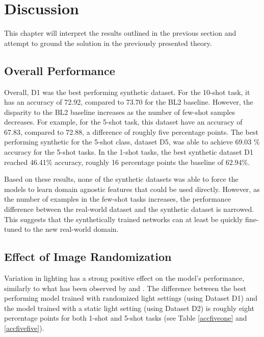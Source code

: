 \chapter{Discussion} %
This chapter will interpret the results outlined in the previous section and attempt to ground the solution in the previously presented theory.

\section{Overall Performance}
Overall, D1 was the best performing synthetic dataset. For the 10-shot task, it has an accuracy of 72.92, compared to 73.70 for the BL2 baseline. However, the disparity to the BL2 baseline increases as the number of few-shot samples decreases. For example, for the 5-shot task, this dataset have an accuracy of 67.83, compared to 72.88, a difference of roughly five percentage points. The best performing synthetic for the 5-shot class, dataset D5, was able to achieve 69.03 \% accuracy for the 5-shot tasks. In the 1-shot tasks, the best synthetic dataset D1 reached 46.41\% accuracy, roughly 16 percentage points the baseline of 62.94\%.


Based on these results, none of the synthetic datasets was able to force the models to learn domain agnostic features that could be used directly. However, as the number of examples in the few-shot tasks increases, the performance difference between the real-world dataset and the synthetic dataset is narrowed. This suggests that the synthetically trained networks can at least be quickly fine-tuned to the new real-world domain.

\section{Effect of Image Randomization}
Variation in lighting has a strong positive effect on the model's performance, similarly to what has been observed by \textcite{domainrand} and \textcite{goodsynthetic}. The difference between the best performing model trained with randomized light settings (using Dataset D1) and the model trained with a static light setting (using Dataset D2) is roughly eight percentage points for both 1-shot and 5-shot tasks (see Table \ref{accfiveone} and  \ref{accfivefive}). 


